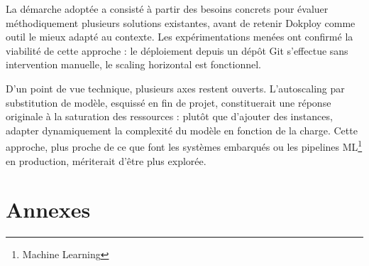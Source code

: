 \documentclass{rapportClass} %
\begin{document}
La démarche adoptée a consisté à partir des besoins concrets pour évaluer méthodiquement plusieurs solutions existantes,
avant de retenir Dokploy comme outil le mieux adapté au contexte. 
Les expérimentations menées ont confirmé la viabilité de cette approche : le déploiement depuis un dépôt Git s'effectue 
sans intervention manuelle, le scaling horizontal est fonctionnel.


D'un point de vue technique, plusieurs axes restent ouverts. 
L'autoscaling par substitution de modèle, esquissé en fin de projet, constituerait une réponse 
originale à la saturation des ressources : plutôt que d'ajouter des instances, 
adapter dynamiquement la complexité du modèle en fonction de la charge. 
Cette approche, plus proche de ce que font les systèmes embarqués ou les pipelines ML\footnote{Machine Learning} en production, 
mériterait d'être plus explorée.



\appendix
\chapter{Annexes}


\csvfile
\end{document}
